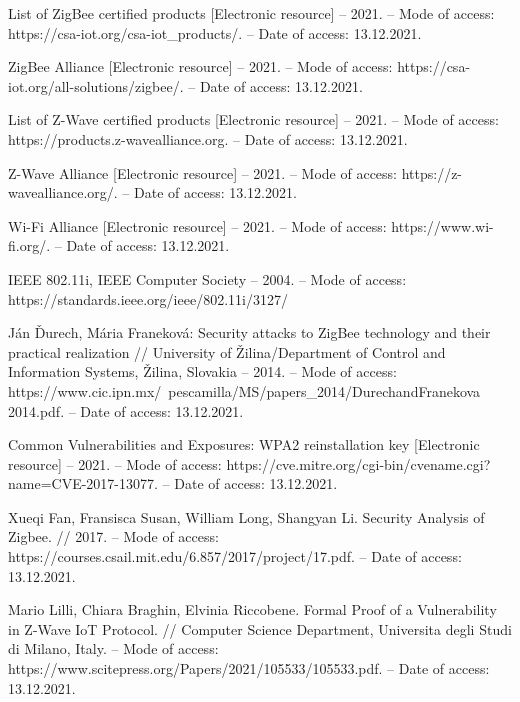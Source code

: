 \newpage
{}
 	
\begin{thebibliography}{1}
	 List of ZigBee certified products [Electronic resource] -- 2021. -- Mode of access: 
	https://csa-iot.org/csa-iot\_products/. -- Date of access: 13.12.2021.
	
	 ZigBee Alliance [Electronic resource] -- 2021. -- Mode of access: 
	https://csa-iot.org/all-solutions/zigbee/. -- Date of access: 13.12.2021.
	
	 List of Z-Wave certified products [Electronic resource] -- 2021. -- Mode of access: 
	https://products.z-wavealliance.org. -- Date of access: 13.12.2021.
	
	 Z-Wave Alliance [Electronic resource] -- 2021. -- Mode of access: 
	 https://z-wavealliance.org/. -- Date of access: 13.12.2021.
	
	 Wi-Fi Alliance [Electronic resource] -- 2021. -- Mode of access: 
	https://www.wi-fi.org/. -- Date of access: 13.12.2021.
	
	 IEEE 802.11i, IEEE Computer Society -- 2004. -- Mode of access: 
	https://standards.ieee.org/ieee/802.11i/3127/
	
	 Ján Ďurech, Mária Franeková: Security attacks to ZigBee technology and their practical realization // 
	University of Žilina/Department of Control and Information Systems, Žilina, Slovakia -- 2014.
	-- Mode of access: https://www.cic.ipn.mx/~pescamilla/MS/papers\_2014/DurechandFranekova
	\newline 2014.pdf.   -- Date of access: 13.12.2021.
 	
 	 Common Vulnerabilities and Exposures: WPA2 reinstallation key [Electronic resource] -- 2021.
 	-- Mode of access: https://cve.mitre.org/cgi-bin/cvename.cgi?name=CVE-2017-13077.   -- Date of access: 13.12.2021.
 
	 Xueqi Fan, Fransisca Susan, William Long, Shangyan Li. Security Analysis of Zigbee. // 2017.
	-- Mode of access: https://courses.csail.mit.edu/6.857/2017/project/17.pdf. -- Date of access: 13.12.2021.
	
	 Mario Lilli, Chiara Braghin, Elvinia Riccobene. Formal Proof of a Vulnerability in 
	Z-Wave IoT Protocol. // Computer Science Department, Universita degli Studi di Milano, Italy.
	-- Mode of access: https://www.scitepress.org/Papers/2021/105533/105533.pdf. -- Date of access: 13.12.2021.
	

\end{thebibliography}
